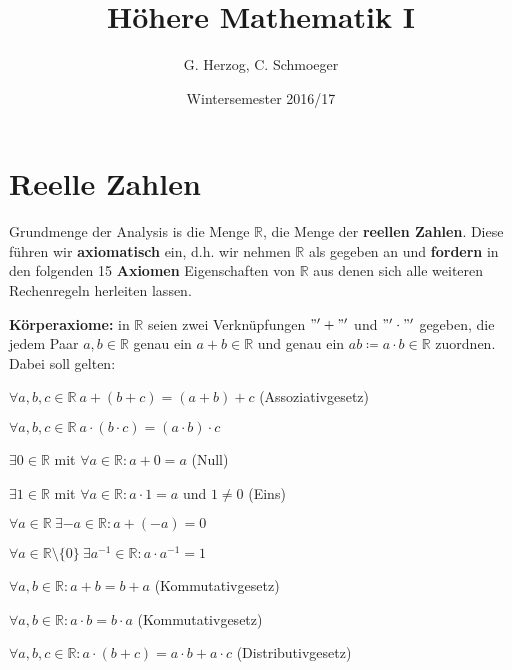 \documentclass{extreport}
\title{Höhere Mathematik I}
\author{G. Herzog, C. Schmoeger}
\date{Wintersemester 2016/17}
\newcommand{\R}{\mathbb{R}}
\theoremstyle{named}
\theoremstyle{dotless}
\begin{document}
\maketitle
	
\tableofcontents
 \thispagestyle{empty}
 \newpage 
  
\chapter{Reelle Zahlen}

Grundmenge der Analysis is die Menge $\R$, die Menge der \textbf{reellen Zahlen}. Diese führen wir \textbf{axiomatisch} ein, d.h. wir nehmen $\R$ als gegeben an und \textbf{fordern} in den folgenden 15 \textbf{Axiomen} Eigenschaften von $\R$ aus denen sich alle weiteren Rechenregeln herleiten lassen.
\newline

\textbf{Körperaxiome:} in $\R$ seien zwei Verknüpfungen $"'+"'$ und $"'\cdot"'$ gegeben, die jedem Paar $a, b \in \R$ genau ein $a + b \in \R$ und genau ein $a b \coloneqq a \cdot b \in \R$ zuordnen. Dabei soll gelten:


\begin{description} \addtolength{\itemindent}{0.4cm} \label{k.axiom}
	\item[$(A1)$] $\forall a, b, c \in \R \: a + \left( b + c \right) = \left( a + b \right) + c$  (Assoziativgesetz) \label{k.axiom-a1}
	\item[$(A5)$] $\forall a, b, c \in \R \: a \cdot \left( b \cdot c \right) = \left( a \cdot b \right) \cdot c$ \label{k.axiom-a5}
	\item[$(A2)$] $\exists 0 \in \R$ mit $\forall a \in \R : a + 0 = a$ (Null) \label{k.axiom-a2}
	\item[$(A6)$] $\exists 1 \in \R$ mit $\forall a \in \R : a \cdot 1 = a$ und $1 \neq 0$ (Eins) \label{k.axiom-a6}
	\item[$(A3)$] $\forall a \in \R ~ \exists -a \in \R : a + (-a) = 0$ \label{k.axiom-a3}
	\item[$(A7)$] $\forall a \in \R \setminus \{ 0 \} ~ \exists a^{-1} \in \R : a \cdot a^{-1} = 1$ \label{k.axiom-a7}
	\item[$(A4)$] $\forall a, b \in \R : a + b = b + a$ (Kommutativgesetz) \label{k.axiom-a4}
	\item[$(A8)$] $\forall a, b \in \R : a \cdot b = b \cdot a$ \label{k.axiom-a8}(Kommutativgesetz)
	\item[$(A9)$] $\forall a, b, c \in \R : a \cdot (b + c) = a \cdot b + a \cdot c$ (Distributivgesetz) \label{k.axiom-a9}
\end{description}
\end{document}
